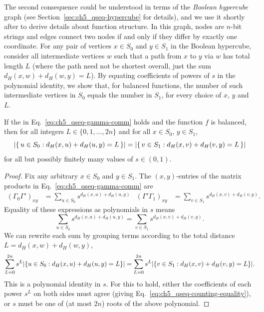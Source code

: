 The second consequence could be understood in terms of the \emph{Boolean hypercube} graph (see Section~\ref{sec:ch5_qseq-hypercube} for details), and we use it shortly after to derive details about function structure.
In this graph, nodes are $n$-bit strings and edges connect two nodes if and only if they differ by exactly one coordinate.
For any pair of vertices $x \in S_0$ and $y \in S_1$ in the Boolean hypercube, consider all intermediate vertices $w$ such that a path from $x$ to $y$ via $w$ has total length $L$ (where the path need not be shortest overall, just the sum $d_H(x,w) + d_H(w,y) = L$).
By equating coefficients of powers of $s$ in the polynomial identity, we show that, for balanced functions, the number of such intermediate vertices in $S_0$ equals the number in $S_1$, for every choice of $x$, $y$ and $L$.

\begin{theorem}\label{thm:ch5_qseq-counting}
    If the \gammacomm{} in Eq.~\eqref{eq:ch5_qseq-gamma-comm} holds and the function $f$ is balanced, then for all integers $L \in \{0,1,\ldots,2n\}$ and for all $x \in S_0$, $y \in S_1$,
    \begin{equation}\label{eq:ch5_qseq-counting-equality}
        \abs{\{\,u \in S_0 : d_H(x,u) + d_H(u,y) = L\,\}}
        =
        \abs{\{\,v \in S_1 : d_H(x,v) + d_H(v,y) = L\,\}}
    \end{equation}
    for all but possibly finitely many values of $s \in (0,1)$.
\end{theorem}

\begin{proof}
    Fix any arbitrary $x \in S_0$ and $y \in S_1$.
    The $(x,y)$-entries of the matrix products in Eq.~\eqref{eq:ch5_qseq-gamma-comm} are
    \begin{align}
        (\Gamma_0 \Gamma')_{xy} &= \sum_{u \in S_0} s^{d_H(x,u) + d_H(u,y)}&
        (\Gamma' \Gamma_1)_{xy} &= \sum_{v \in S_1} s^{d_H(x,v) + d_H(v,y)}.
    \end{align}
    Equality of these expressions as polynomials in $s$ means
    \begin{equation}
        \sum_{u \in S_0} s^{d_H(x,u) + d_H(u,y)} = \sum_{v \in S_1} s^{d_H(x,v) + d_H(v,y)}.
    \end{equation}
    We can rewrite each sum by grouping terms according to the total distance \\ $L = d_H(x,w) + d_H(w,y)$,%
    \begin{equation}\label{eq:ch5_qseq-counting-polynomial}
        \sum_{L=0}^{2n} s^L \abs{\{u \in S_0 : d_H(x,u) + d_H(u,y) = L\}}
        =
        \sum_{L=0}^{2n} s^L \abs{\{v \in S_1 : d_H(x,v) + d_H(v,y) = L\}}.
    \end{equation}
    This is a polynomial identity in $s$.
    For this to hold, either the coefficients of each power $s^L$ on both sides must agree (giving Eq.~\eqref{eq:ch5_qseq-counting-equality}), or $s$ must be one of (at most $2n$) roots of the above polynomial.
\end{proof}

